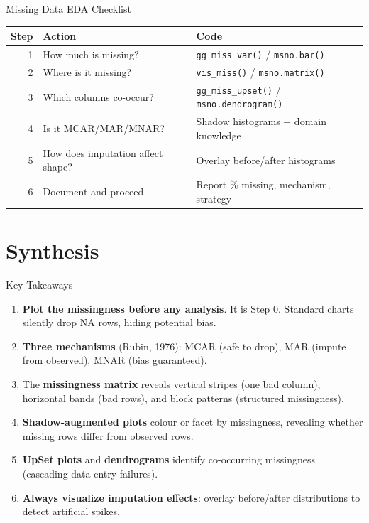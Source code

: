 \documentclass[10pt]{beamer}
\begin{document}
\begin{frame}{Missing Data EDA Checklist}
  \centering
  \begin{tabular}{rlp{6cm}}
    \toprule
    \textbf{Step} & \textbf{Action} & \textbf{Code} \\
    \midrule
    1 & How much is missing? & \texttt{gg\_miss\_var()} / \texttt{msno.bar()} \\
    2 & Where is it missing? & \texttt{vis\_miss()} / \texttt{msno.matrix()} \\
    3 & Which columns co-occur? & \texttt{gg\_miss\_upset()} / \texttt{msno.dendrogram()} \\
    4 & Is it MCAR/MAR/MNAR? & Shadow histograms + domain knowledge \\
    5 & How does imputation affect shape? & Overlay before/after histograms \\
    6 & Document and proceed & Report \% missing, mechanism, strategy \\
    \bottomrule
  \end{tabular}
\end{frame}

\section{Synthesis}

\begin{frame}{Key Takeaways}
  \begin{enumerate}
    \item \textbf{Plot the missingness before any analysis}. It is Step 0.
          Standard charts silently drop NA rows, hiding potential bias.
    \item \textbf{Three mechanisms} (Rubin, 1976): MCAR (safe to drop),
          MAR (impute from observed), MNAR (bias guaranteed).
    \item The \textbf{missingness matrix} reveals vertical stripes (one
          bad column), horizontal bands (bad rows), and block patterns
          (structured missingness).
    \item \textbf{Shadow-augmented plots} colour or facet by missingness,
          revealing whether missing rows differ from observed rows.
    \item \textbf{UpSet plots} and \textbf{dendrograms} identify
          co-occurring missingness (cascading data-entry failures).
    \item \textbf{Always visualize imputation effects}: overlay
          before/after distributions to detect artificial spikes.
  \end{enumerate}
\end{frame}
\end{document}
